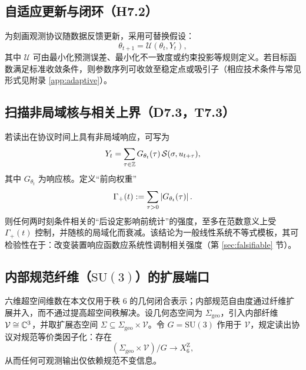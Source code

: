 \subsection{自适应更新与闭环（H7.2）}

为刻画观测协议随数据反馈更新，采用可替换假设：
\[
\theta_{t+1}=\mathcal{U}(\theta_t,Y_t),
\]
其中 $\mathcal{U}$ 可由最小化预测误差、最小化不一致度或约束投影等规则定义。若目标函数满足标准收敛条件，则参数序列可收敛至稳定点或吸引子（相应技术条件与常见形式见附录 \ref{app:adaptive}）。

\subsection{扫描非局域核与相关上界（D7.3，T7.3）}

若读出在协议时间上具有非局域响应，可写为
\[
Y_t=\sum_{\tau\in\mathbb{Z}} G_{\theta_t}(\tau)\,\mathcal{S}(\sigma,u_{t+\tau}),
\]
其中 $G_{\theta_t}$ 为响应核。定义“前向权重”
\[
\Gamma_+(t):=\sum_{\tau>0}\left\lvert G_{\theta_t}(\tau)\right\rvert.
\]
则任何两时刻条件相关的“后设定影响前统计”的强度，至多在范数意义上受 $\Gamma_+(t)$ 控制，并随核的局域化而衰减。该结论为一般线性系统不等式模板，其可检验性在于：改变装置响应函数应系统性调制相关强度（第 \ref{sec:falsifiable} 节）。

\subsection{内部规范纤维（\texorpdfstring{$\mathrm{SU}(3)$}{SU(3)}）的扩展端口}
六维超空间维数在本文仅用于秩 $6$ 的几何闭合表示；内部规范自由度通过纤维扩展并入，而不通过提高超空间秩解决。设几何态空间为 $\Sigma_{\mathrm{geo}}$，引入内部纤维 $\mathcal{V}\cong\mathbb{C}^3$，并取扩展态空间 $\Sigma\subseteq\Sigma_{\mathrm{geo}}\times\mathcal{V}$。令 $G=\mathrm{SU}(3)$ 作用于 $\mathcal{V}$，规定读出协议对规范等价类因子化：存在
$$
(\Sigma_{\mathrm{geo}}\times\mathcal{V})/G\to X_6^{\mathrm Z},
$$
从而任何可观测输出仅依赖规范不变信息。